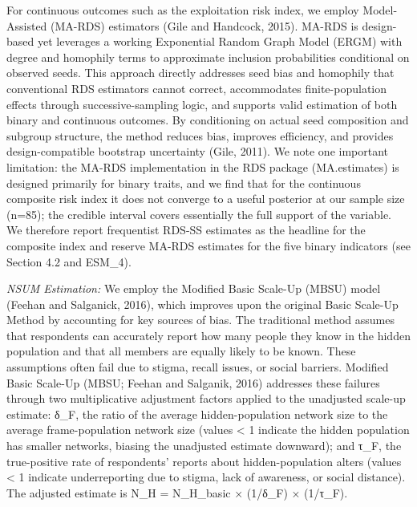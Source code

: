 \documentclass[
  12pt,
  letterpaper,
  DIV=11,
  numbers=noendperiod]{scrartcl}
\begin{document}
For continuous outcomes such as the exploitation risk index, we employ
Model-Assisted (MA-RDS) estimators (Gile and Handcock, 2015). MA-RDS is
design-based yet leverages a working Exponential Random Graph Model
(ERGM) with degree and homophily terms to approximate inclusion
probabilities conditional on observed seeds. This approach directly
addresses seed bias and homophily that conventional RDS estimators
cannot correct, accommodates finite-population effects through
successive-sampling logic, and supports valid estimation of both binary
and continuous outcomes. By conditioning on actual seed composition and
subgroup structure, the method reduces bias, improves efficiency, and
provides design-compatible bootstrap uncertainty (Gile, 2011). We note
one important limitation: the MA-RDS implementation in the RDS package
(MA.estimates) is designed primarily for binary traits, and we find that
for the continuous composite risk index it does not converge to a useful
posterior at our sample size (n=85); the credible interval covers
essentially the full support of the variable. We therefore report
frequentist RDS-SS estimates as the headline for the composite index and
reserve MA-RDS estimates for the five binary indicators (see Section 4.2
and ESM\_4).

\emph{NSUM Estimation:} We employ the Modified Basic Scale-Up (MBSU)
model (Feehan and Salganick, 2016), which improves upon the original
Basic Scale-Up Method by accounting for key sources of bias. The
traditional method assumes that respondents can accurately report how
many people they know in the hidden population and that all members are
equally likely to be known. These assumptions often fail due to stigma,
recall issues, or social barriers. Modified Basic Scale-Up (MBSU; Feehan
and Salganik, 2016) addresses these failures through two multiplicative
adjustment factors applied to the unadjusted scale-up estimate: δ\_F,
the ratio of the average hidden-population network size to the average
frame-population network size (values \textless{} 1 indicate the hidden
population has smaller networks, biasing the unadjusted estimate
downward); and τ\_F, the true-positive rate of respondents' reports
about hidden-population alters (values \textless{} 1 indicate
underreporting due to stigma, lack of awareness, or social distance).
The adjusted estimate is N\_H = N\_H\_basic × (1/δ\_F) × (1/τ\_F).
\end{document}
